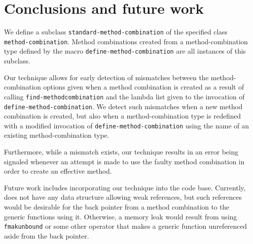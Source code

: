 \section{Conclusions and future work}
\label{sec-conclusions}

We define a subclass \texttt{standard-method-combination} of the
specified class \texttt{method-combination}.  Method combinations
created from a method-combination type defined by the macro
\texttt{define-method-combination} are all instances of this subclass.

Our technique allows for early detection of mismatches between the
method-combination options given when a method combination is created
as a result of calling \texttt{find-method\-combination} and the lambda
list given to the invocation of \texttt{define-method-combination}.
We detect such mismatches when a new method combination is created,
but also when a method-combination type is redefined with a modified
invocation of \texttt{define-method-combination} using the name
of an existing method-combination type.

Furthermore, while a mismatch exists, our technique results in an
error being signaled whenever an attempt is made to use the faulty
method combination in order to create an effective method.

Future work includes incorporating our technique into the \sicl{} code
base.  Currently, \sicl{} does not have any data structure allowing
weak references, but such references would be desirable for the back
pointer from a method combination to the generic functions using it.
Otherwise, a memory leak would result from using \texttt{fmakunbound}
or some other operator that makes a generic function unreferenced
aside from the back pointer.

